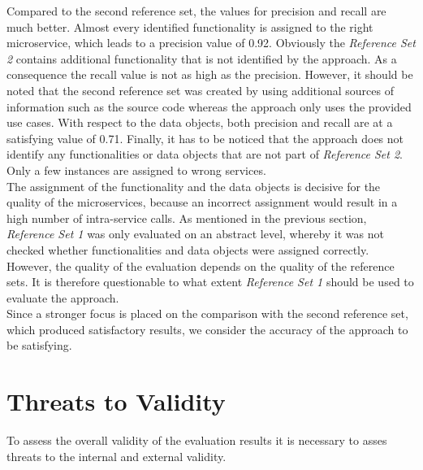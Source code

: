 \noindent
Compared to the second reference set, the values for precision and recall are much better. Almost every identified functionality is assigned to the right microservice, which leads to a precision value of 0.92. Obviously the \textit{Reference Set 2} contains additional functionality that is not identified by the approach. As a consequence the recall value is not as high as the precision. However, it should be noted that the second reference set was created by using additional sources of information such as the source code whereas the approach only uses the provided use cases. With respect to the data objects, both precision and recall are at a satisfying value of 0.71. Finally, it has to be noticed that the approach does not identify any functionalities or data objects that are not part of \textit{Reference Set 2}. Only a few instances are assigned to wrong services. \\

\noindent
The assignment of the functionality and the data objects is decisive for the quality of the microservices, because an incorrect assignment would result in a high number of intra-service calls. As mentioned in the previous section, \textit{Reference Set 1} was only evaluated on an abstract level, whereby it was not checked whether functionalities and data objects were assigned correctly. However, the quality of the evaluation depends on the quality of the reference sets. It is therefore questionable to what extent \textit{Reference Set 1} should be used to evaluate the approach.\\
Since a stronger focus is placed on the comparison with the second reference set, which produced satisfactory results, we consider the accuracy of the approach to be satisfying.

 






\section{Threats to Validity}
\label{sec:Evalutation:ThreatsToValidity}
To assess the overall validity of the evaluation results it is necessary to asses threats to the internal and external validity. 


